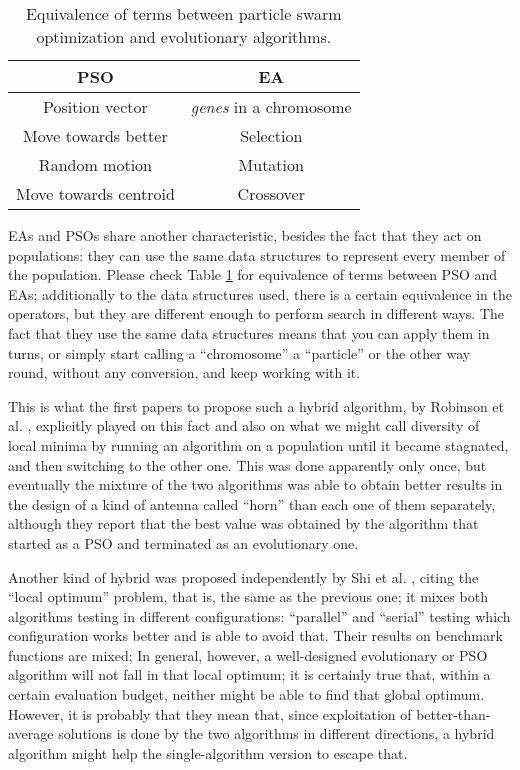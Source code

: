 \begin{table}[h!tb]
    \caption{Equivalence of terms between particle swarm optimization
    and evolutionary algorithms. \label{tab:equivalence}}
\centering
\begin{tabular}{|c|c|}
  \hline
  PSO & EA \\ \hline
  Position vector & {\em genes} in a chromosome \\ \hline
  Move towards better & Selection  \\ \hline
  Random motion & Mutation \\ \hline
  Move towards centroid & Crossover \\ \hline
\end{tabular}
\end{table}
%
EAs and PSOs share another characteristic, besides the fact that they
act on populations: they can use the same data structures to
represent every member of the population. Please check Table
\ref{tab:equivalence} for equivalence of terms between PSO and EAs;
additionally to the data structures used, there is a certain
equivalence in the operators, but they are different enough to perform
search in different ways. The fact that they use the same data
structures means that you can apply them in turns, or simply start
calling a ``chromosome'' a ``particle'' or the other way round,
without any conversion, and keep working with it.

This is what the first papers to propose such a hybrid algorithm, by
Robinson et al. \cite{Robinson2002}, explicitly played on this
fact and also on what we might call diversity of local minima by
running an algorithm on a population until it became stagnated, and
then switching to the other one. This was done apparently only once,
but eventually the mixture of the two algorithms was able to obtain
better results in the design of a kind of antenna called ``horn'' than
each one of them separately, although they report that the best value
was obtained by the algorithm that started as a PSO and terminated as
an evolutionary one.

Another kind of hybrid was proposed independently by 
Shi et al. \cite{shi2003hybrid}, citing the ``local optimum'' problem,
that is, the same as the previous one; it mixes both algorithms
testing in different configurations: ``parallel'' and ``serial''
testing which configuration works better and is able to avoid
that. Their results on benchmark functions are mixed;
In general, however, a well-designed evolutionary or PSO
algorithm will not fall in that local optimum; it is certainly true
that, within a certain evaluation budget, neither might be able to
find that global optimum. However, it is probably that they mean that,
since exploitation of better-than-average solutions is done by the two
algorithms in different directions, a hybrid algorithm might help the
single-algorithm version to escape that.

